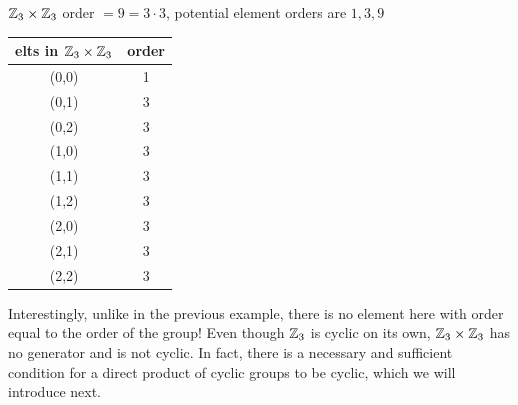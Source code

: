 \begin{example}
    ${\mathbb{ Z}}_3\times {\mathbb{ Z}}_3$ order $=9=3\cdot 3$, potential element orders are $1, 3, 9$
    \begin{table}[ht!]
    \centering
    \begin{tabular}{c|c}
         elts in ${\mathbb{ Z}}_3\times {\mathbb{ Z}}_3$& order   \\ \hline
         (0,0) & 1 \\
         (0,1) & 3 \\
         (0,2) & 3 \\
         (1,0) & 3 \\
         (1,1) & 3 \\
         (1,2) & 3 \\
         (2,0) & 3 \\
         (2,1) & 3 \\
         (2,2) & 3 
    \end{tabular}
    \label{tab:elts_Z3_cross_Z3}
\end{table}
Interestingly, unlike in the previous example, there is no element here with order equal to the order of the group! Even though ${\mathbb{ Z}}_3$ is cyclic on its own, ${\mathbb{ Z}}_3\times {\mathbb{ Z}}_3$ has no generator and is not cyclic. In fact, there is a necessary and sufficient condition for a direct product of cyclic groups to be cyclic, which we will introduce next.
\end{example}
\newpage

